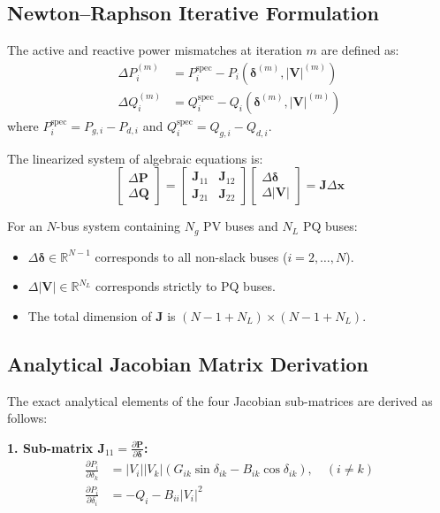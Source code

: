 ﻿\documentclass[conference,10pt]{IEEEtran}
\begin{document}
\subsection{Newton--Raphson Iterative Formulation}
The active and reactive power mismatches at iteration $m$ are defined as:
\begin{align}
\Delta P_i^{(m)} &= P_i^{\text{spec}} - P_i(\boldsymbol{\delta}^{(m)}, |\mathbf{V}|^{(m)}) \\
\Delta Q_i^{(m)} &= Q_i^{\text{spec}} - Q_i(\boldsymbol{\delta}^{(m)}, |\mathbf{V}|^{(m)})
\end{align}
where $P_i^{\text{spec}} = P_{g,i} - P_{d,i}$ and $Q_i^{\text{spec}} = Q_{g,i} - Q_{d,i}$.

The linearized system of algebraic equations is:
\begin{equation}
\begin{bmatrix}
\Delta \mathbf{P} \\
\Delta \mathbf{Q}
\end{bmatrix}
=
\begin{bmatrix}
\mathbf{J}_{11} & \mathbf{J}_{12} \\
\mathbf{J}_{21} & \mathbf{J}_{22}
\end{bmatrix}
\begin{bmatrix}
\Delta \boldsymbol{\delta} \\
\Delta |\mathbf{V}|
\end{bmatrix}
=
\mathbf{J} \Delta \mathbf{x}
\end{equation}

For an $N$-bus system containing $N_g$ PV buses and $N_L$ PQ buses:
\begin{itemize}
    \item $\Delta \boldsymbol{\delta} \in \mathbb{R}^{N-1}$ corresponds to all non-slack buses ($i = 2, \dots, N$).
    \item $\Delta |\mathbf{V}| \in \mathbb{R}^{N_L}$ corresponds strictly to PQ buses.
    \item The total dimension of $\mathbf{J}$ is $(N-1 + N_L) \times (N-1 + N_L)$.
\end{itemize}

\subsection{Analytical Jacobian Matrix Derivation}
The exact analytical elements of the four Jacobian sub-matrices are derived as follows:

\textbf{1. Sub-matrix $\mathbf{J}_{11} = \frac{\partial \mathbf{P}}{\partial \boldsymbol{\delta}}$:}
\begin{align}
\frac{\partial P_i}{\partial \delta_k} &= |V_i| |V_k| \left( G_{ik} \sin\delta_{ik} - B_{ik} \cos\delta_{ik} \right), \quad (i \neq k) \\
\frac{\partial P_i}{\partial \delta_i} &= -Q_i - B_{ii} |V_i|^2
\end{align}
\end{document}
